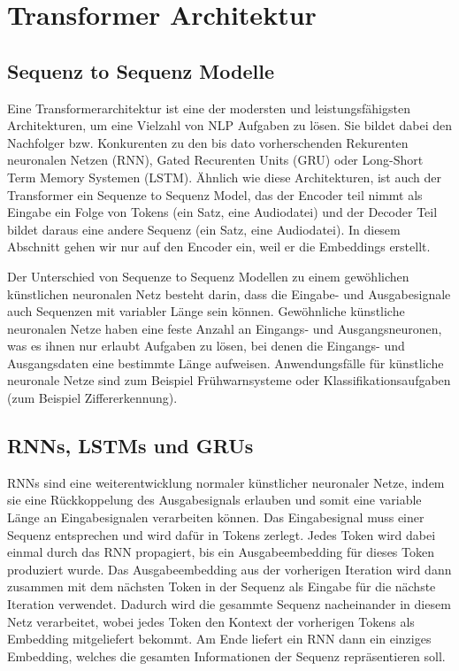 \section{Transformer Architektur}

\subsection{Sequenz to Sequenz Modelle}

Eine Transformerarchitektur ist eine der modersten und leistungsfähigsten Architekturen, um eine Vielzahl von  NLP Aufgaben zu lösen. 
Sie bildet dabei den Nachfolger bzw. Konkurenten zu den bis dato vorherschenden Rekurenten neuronalen Netzen (RNN), Gated Recurenten Units (GRU) oder Long-Short Term Memory Systemen (LSTM). 
Ähnlich wie diese Architekturen, ist auch der Transformer ein Sequenze to Sequenz Model, das der Encoder teil nimmt als Eingabe ein Folge von Tokens (ein Satz, eine Audiodatei) und der Decoder Teil bildet daraus eine andere Sequenz (ein Satz, eine Audiodatei). 
In diesem Abschnitt gehen wir nur auf den Encoder ein, weil er die Embeddings erstellt.

Der Unterschied von Sequenze to Sequenz Modellen zu einem gewöhlichen künstlichen neuronalen Netz besteht darin, dass die Eingabe- und Ausgabesignale auch Sequenzen mit variabler Länge sein können.
Gewöhnliche künstliche neuronalen Netze haben eine feste Anzahl an Eingangs- und Ausgangsneuronen, was es ihnen nur erlaubt Aufgaben zu lösen, bei denen die Eingangs- und Ausgangsdaten eine bestimmte Länge aufweisen.
Anwendungsfälle für künstliche neuronale Netze sind zum Beispiel Frühwarnsysteme oder Klassifikationsaufgaben (zum Beispiel Ziffererkennung).

\subsection{RNNs, LSTMs und GRUs}

RNNs sind eine weiterentwicklung normaler künstlicher neuronaler Netze, indem sie eine Rückkoppelung des Ausgabesignals erlauben und somit eine variable Länge an Eingabesignalen verarbeiten können.
Das Eingabesignal muss einer Sequenz entsprechen und wird dafür in Tokens zerlegt.
Jedes Token wird dabei einmal durch das RNN propagiert, bis ein Ausgabeembedding für dieses Token produziert wurde.
Das Ausgabeembedding aus der vorherigen Iteration wird dann zusammen mit dem nächsten Token in der Sequenz als Eingabe für die nächste Iteration verwendet.
Dadurch wird die gesammte Sequenz nacheinander in diesem Netz verarbeitet, wobei jedes Token den Kontext der vorherigen Tokens als Embedding mitgeliefert bekommt.
Am Ende liefert ein RNN dann ein einziges Embedding, welches die gesamten Informationen der Sequenz repräsentieren soll.

